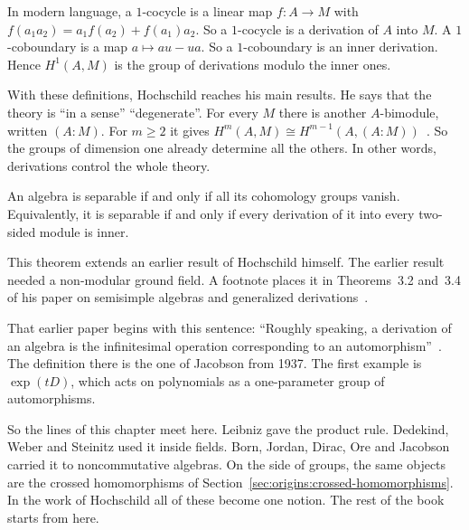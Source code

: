 In modern language, a $1$-cocycle is a linear map
$f\colon A \to M$ with $f(a_1a_2) = a_1 f(a_2) + f(a_1) a_2$. So a
$1$-cocycle is a derivation of $A$ into $M$. A $1$-coboundary is a map
$a \mapsto a u - u a$. So a $1$-coboundary is an inner derivation. Hence
$H^1(A,M)$ is the group of derivations modulo the inner ones.

With these definitions, Hochschild reaches his main results. He says that the theory is ``in a sense''
``degenerate''. For every $M$ there is another $A$-bimodule, written $(A:M)$.
For $m \ge 2$ it gives
$H^m(A,M) \cong H^{m-1}(A, (A:M))$~\cite[Theorem~3.1, p.~60]{Hochschild1945}.
So the groups of dimension one already determine all the others. In other
words, derivations control the whole theory.

\begin{theorem}\label{thm:origins:hochschild-separable}
An algebra is separable if and only if all its cohomology groups vanish.
Equivalently, it is separable if and only if every derivation of it into
every two-sided module is inner.
\end{theorem}

This theorem extends an earlier result of Hochschild himself. The earlier
result needed a non-modular ground field. A footnote places it in
Theorems~3.2 and~3.4 of his paper on semisimple algebras and generalized
derivations~\cite[p.~58, footnote~3]{Hochschild1945}.

That earlier paper begins with this sentence: ``Roughly speaking, a derivation of an algebra is
the infinitesimal operation corresponding to an
automorphism''~\cite[p.~677]{Hochschild1942}. The definition there is the one
of Jacobson from 1937. The first example is $\exp(tD)$, which acts on
polynomials as a one-parameter group of automorphisms.

So the lines of this chapter meet here. Leibniz gave the product rule.
Dedekind, Weber and Steinitz used it inside fields. Born, Jordan, Dirac, Ore
and Jacobson carried it to noncommutative algebras. On the side of groups, the
same objects are the crossed homomorphisms of
Section~\ref{sec:origins:crossed-homomorphisms}. In the work of Hochschild
all of these become one notion. The rest of the book starts from here.
